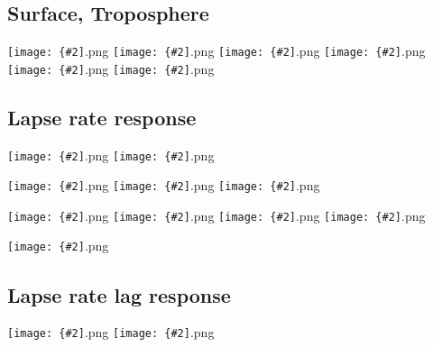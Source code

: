 \documentclass[12pt,a4paper]{article}
\newcommand{\pngfig}[2][0.5]{\texttt{[image: \{\#2]}.png}}
\begin{document}
\section{}

\subsection{Surface, Troposphere}
\pngfig[0.5]{comp_Tmax_sfc}
\pngfig[0.5]{comp_Tmin_sfc}
\pngfig[0.5]{comp_Tmax_700}
\pngfig[0.5]{comp_Tmin_700}
\pngfig[0.5]{comp_Tmax_300}
\pngfig[0.5]{comp_Tmin_300}

\subsection{Lapse rate response}
\pngfig[0.5]{regprof_TO_Zon_NH}
\pngfig[0.5]{comp_trop_zonal_profiles_m06}

\pngfig[0.5]{zonal_prof_land}
\pngfig[0.5]{zonal_prof_ocean}
\pngfig[0.5]{zonal_prof}

\pngfig[0.5]{theta_zonal_prof_land}
\pngfig[0.5]{theta_zonal_prof_ocean}
\pngfig[0.5]{theta_zonal_prof}
\pngfig[0.5]{theta_zonal_prof_zoom}


\pngfig[0.5]{cont_maxtemp_profile}

\subsection{Lapse rate lag response}

\pngfig[0.5]{3d_lag_lat15_30_v1}
\pngfig[0.5]{3d_lag_lat15_30_v2}
\end{document}
